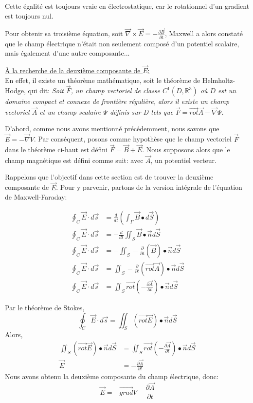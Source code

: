 \documentclass[12pt]{article}
\newcommand{\R}{\mathbb{R}}
\begin{document}
\noindent Cette égalité est toujours vraie en électrostatique, car le rotationnel d'un gradient est toujours nul.

\noindent Pour obtenir sa troisième équation, soit $\vec{\nabla} \times \vec{E}=-\frac{\partial \vec{B}}{\partial t}$, Maxwell a alors constaté que le champ électrique n'était non seulement composé d'un potentiel scalaire, mais également d'une autre composante...

\noindent \underline{À la recherche de la deuxième composante de $\vec{E}$:}
\\\noindent En effet, il existe un théorème mathématique, soit le théorème de Helmholtz-Hodge, qui dit: \textit{Soit $\vec{F}$, un champ vectoriel de classe $C^1 (D,\R^3)$ où $D$ est un domaine compact et connexe de frontière régulière, alors il existe un champ vectoriel $\vec{A}$ et un champ scalaire $\Psi$ définis sur D tels que $\vec{F}=\vec{rot}\vec{A}-\vec{\nabla}\Psi$.}

\noindent D'abord, comme nous avons mentionné précédemment, nous savons que $\vec{E}=-\vec{\nabla}V$. Par conséquent, posons comme hypothèse que le champ vectoriel $\vec{F}$ dans le théorème ci-haut est défini $\vec{F}=\vec{B}+\vec{E}$. Nous supposons alors que le champ magnétique est défini comme suit:  avec $\vec{A}$, un potentiel vecteur.

\noindent Rappelons que l'objectif dans cette section est de trouver la deuxième composante de $\vec{E}$. Pour y parvenir, partons de la version intégrale de l'équation de Maxwell-Faraday:


\begin{align*}
\oint_C \Vec{E} \cdot d\Vec{s} &= \frac{d}{dt} (\int_\Gamma \vec{B} \bullet d\Vec{S})
\\\oint_C \Vec{E} \cdot d\Vec{s} &=-\frac{d}{dt}\iint_S \vec{B} \bullet \vec{n}d\vec{S}
\\\oint_C \Vec{E} \cdot d\Vec{s} &=-\iint_S-\frac{\partial}{\partial t} (\vec{B} )\bullet \vec{n}d\vec{S}
\\\oint_C \Vec{E} \cdot d\Vec{s} &=\iint_S-\frac{\partial}{\partial t} (\vec{rot}\vec{A})\bullet \vec{n}d\vec{S}
\\\oint_C \Vec{E} \cdot d\Vec{s} &=\iint_S\vec{rot}(-\frac{\partial \vec{A}}{\partial  t}) \bullet \vec{n}d\vec{S}
\end{align*}

\noindent Par le théorème de Stokes,
 $$ \oint_C \Vec{E} \cdot d\Vec{s} = \iint_S (\vec{rot}\vec{E}) \bullet \vec{n}d\vec{S} $$
\noindent Alors,
\begin{align*}
\iint_S (\vec{rot}\vec{E}) \bullet \vec{n}d\vec{S} & =\iint_S\vec{rot}(-\frac{\partial \vec{A}}{\partial  t}) \bullet \vec{n}d\vec{S}
\\\vec{E} & = -\frac{\partial \vec {A}}{\partial t}
\end{align*}
\noindent Nous avons obtenu la deuxième composante du champ électrique, donc:
$$\vec{E}=-\vec{grad}V-\frac{\partial \vec{A}}{\partial t}$$
\end{document}
